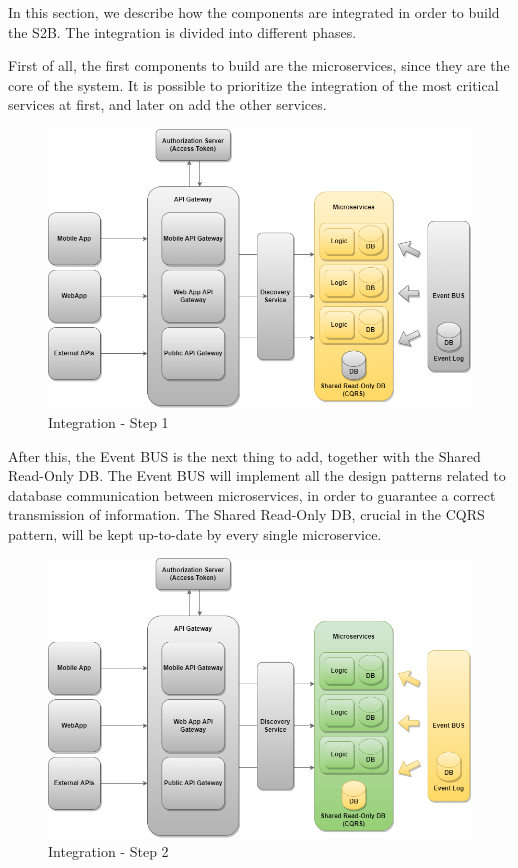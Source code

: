 

In this section, we describe how the components are integrated in order to build the S2B. The integration is divided into different phases.
\newline

First of all, the first components to build are the microservices, since they are the core of the system. It is possible to prioritize the integration of the most critical services at first, and later on add the other services.

\begin{figure}[H]
	\centering
    \includegraphics[scale=0.4]{Images/Impl, Integr & Test/Integration Plan - Step 1.png}
	\caption{\label{fig:integration_plan_step_1}Integration - Step 1}
\end{figure}

After this, the Event BUS is the next thing to add, together with the Shared Read-Only DB. The Event BUS will implement all the design patterns related to database communication between microservices, in order to guarantee a correct transmission of information. The Shared Read-Only DB, crucial in the CQRS pattern, will be kept up-to-date by every single microservice.

\begin{figure}[H]
	\centering
    \includegraphics[scale=0.4]{Images/Impl, Integr & Test/Integration Plan - Step 2.png}
	\caption{\label{fig:integration_plan_step_2}Integration - Step 2}
\end{figure}

